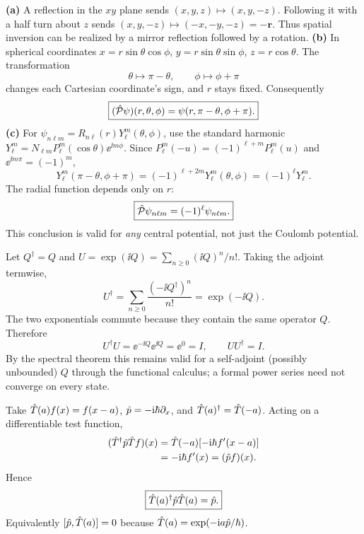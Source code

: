 \textbf{(a)} A reflection in the $xy$ plane sends
$(x,y,z)\mapsto(x,y,-z)$. Following it with a
half turn about $z$ sends
$(x,y,-z)\mapsto(-x,-y,-z)=-\mathbf r$.
Thus spatial inversion can be realized by a
mirror reflection followed by a rotation.
\textbf{(b)} In spherical coordinates
$x=r\sin\theta\cos\phi$, $y=r\sin\theta\sin\phi$,
$z=r\cos\theta$. The transformation
\[
\theta\longmapsto\pi-\theta,\qquad
\phi\longmapsto\phi+\pi
\]
changes each Cartesian coordinate's sign,
and $r$ stays fixed. Consequently
\begin{equation}
\boxed{(\hat{\mathcal P}\psi)(r,\theta,\phi)=
\psi(r,\pi-\theta,\phi+\pi).}
\end{equation}
\textbf{(c)} For $\psi_{n\ell m}=R_{n\ell}(r)
Y_\ell^m(\theta,\phi)$, use the standard
harmonic $Y_\ell^m=N_{\ell m}
P_\ell^m(\cos\theta)\ee^{\ii m\phi}$.
Since
$P_\ell^m(-u)=(-1)^{\ell+m}P_\ell^m(u)$ and
$\ee^{\ii m\pi}=(-1)^m$,
\[
Y_\ell^m(\pi-\theta,\phi+\pi)
=(-1)^{\ell+2m}Y_\ell^m(\theta,\phi)
=(-1)^\ell Y_\ell^m.
\]
The radial function depends only on $r$:
\begin{equation}
\boxed{\hat{\mathcal P}\psi_{n\ell m}=(-1)^\ell\psi_{n\ell m}.}
\end{equation}
This conclusion is valid for \emph{any} central
potential, not just the Coulomb potential.

Let $Q^\dagger=Q$ and
$U=\exp(\ii Q)=\sum_{n\ge0}(\ii Q)^n/n!$.
Taking the adjoint termwise,
\[
U^\dagger=\sum_{n\ge0}
\frac{(-\ii Q^\dagger)^n}{n!}
=\exp(-\ii Q).
\]
The two exponentials commute because
they contain the same operator $Q$.
Therefore
\begin{equation}
\boxed{U^\dagger U=
\ee^{-\ii Q}\ee^{\ii Q}=
\ee^{0}=I,\qquad UU^\dagger=I.}
\end{equation}
By the spectral theorem this remains
valid for a self-adjoint (possibly
unbounded) $Q$ through the functional
calculus; a formal power series need
not converge on every state.

Take $\hat T(a)f(x)=f(x-a)$,
$\hat p=-\mathrm i\hbar\partial_x$, and
$\hat T(a)^\dagger=\hat T(-a)$. Acting on
a differentiable test function,
\begin{align}
(\hat T^\dagger\hat p\hat T f)(x)
&=\hat T(-a)[-\mathrm i\hbar f'(x-a)]\\
&=-\mathrm i\hbar f'(x)=(\hat p f)(x).
\end{align}
Hence
\begin{equation}
\boxed{\hat T(a)^\dagger\hat p\hat T(a)=\hat p.}
\end{equation}
Equivalently $[\hat p,\hat T(a)]=0$
because $\hat T(a)=\exp(-\mathrm i a\hat p/\hbar)$.

